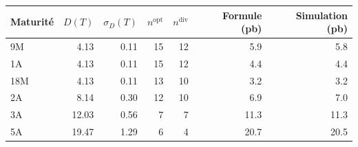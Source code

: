 {\small\begin{tabular}{lrrrrrr}
\toprule
Maturité & $D(T)$ & $\sigma_D(T)$ & $n^{\mathrm{opt}}$ & $n^{\mathrm{div}}$ & Formule (pb) & Simulation (pb) \\
\midrule
9M & \num{4.13} & \num{0.11} & 15 & 12 & \num{5.9} & \num{5.8} \\
1A & \num{4.13} & \num{0.11} & 15 & 12 & \num{4.4} & \num{4.4} \\
18M & \num{4.13} & \num{0.11} & 13 & 10 & \num{3.2} & \num{3.2} \\
2A & \num{8.14} & \num{0.30} & 12 & 10 & \num{6.9} & \num{7.0} \\
3A & \num{12.03} & \num{0.56} & 7 & 7 & \num{11.3} & \num{11.3} \\
5A & \num{19.47} & \num{1.29} & 6 & 4 & \num{20.7} & \num{20.5} \\
\bottomrule
\end{tabular}}
